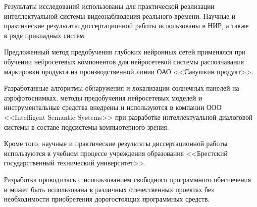 
Результаты исследований использованы для практической реализации интеллектуальной системы видеонаблюдения реального времени. Научные и практические результаты диссертационной работы использованы в НИР, а также в ряде прикладных систем.

Предложенный метод предобучения глубоких нейронных сетей применялся при обучении нейросетевых компонентов для нейросетевой системы распознавания маркировки продукта на производственной линии ОАО <<Савушкин продукт>>.

Разработанные алгоритмы обнаружения и локализации солнечных панелей на аэрофотоснимках, методы предобучения нейросетевых моделей и инструментальные средства внедрены и используются в компании ООО <<Intelligent Semantic Systems>> при разработке интеллектуальной диалоговой системы в составе подсистемы компьютерного зрения.

Кроме того, научные и практические результаты диссертационной работы используются в учебном процессе учреждения образования <<Брестский государственный технический университет>>.


Разработка проводилась с использованием свободного программного обеспечения и может быть использована в различных отечественных проектах без необходимости приобретения дорогостоящих программных средств.

